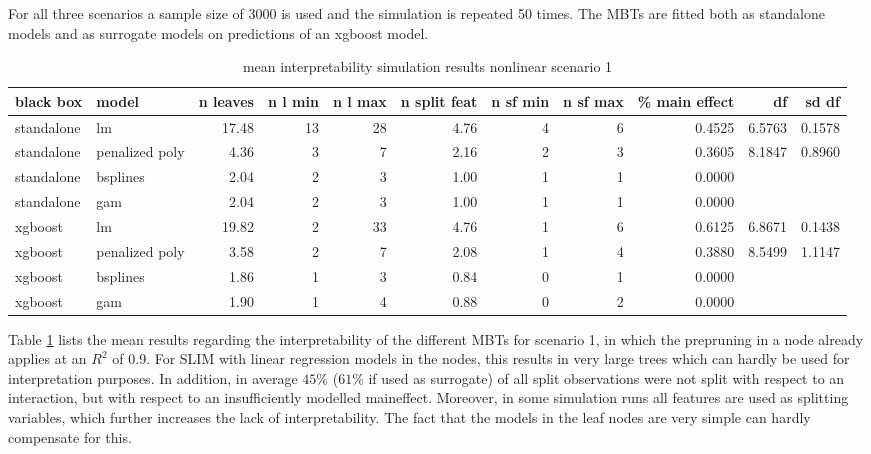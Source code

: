 For all three scenarios a sample size of 3000 is used and the simulation is repeated 50 times. The MBTs are fitted both as standalone models and as surrogate models on predictions of an xgboost model.


\begin{table}[!htb]

\caption{mean interpretability simulation results nonlinear scenario 1}
\centering \tiny
\begin{tabular}[t]{l|l|r|r|r|r|r|r|r|r|r}
\hline
black box & model & n leaves & n l min & n l max & n split feat & n sf min & n sf max & \% main effect & df & sd df\\
\hline
standalone & lm & 17.48 & 13 & 28 & 4.76 & 4 & 6 & 0.4525 & 6.5763 & 0.1578\\
standalone & penalized poly & 4.36 & 3 & 7 & 2.16 & 2 & 3 & 0.3605 & 8.1847 & 0.8960\\
standalone & bsplines & 2.04 & 2 & 3 & 1.00 & 1 & 1 & 0.0000 &  & \\
standalone & gam & 2.04 & 2 & 3 & 1.00 & 1 & 1 & 0.0000 &  & \\
\hline
xgboost & lm & 19.82 & 2 & 33 & 4.76 & 1 & 6 & 0.6125 & 6.8671 & 0.1438\\
xgboost & penalized poly & 3.58 & 2 & 7 & 2.08 & 1 & 4 & 0.3880 & 8.5499 & 1.1147\\
xgboost & bsplines & 1.86 & 1 & 3 & 0.84 & 0 & 1 & 0.0000 &  & \\
xgboost & gam & 1.90 & 1 & 4 & 0.88 & 0 & 2 & 0.0000 &  & \\

\hline
\end{tabular}
\label{tab:linear_mixed_1_interpretability}

\end{table}

Table \ref{tab:linear_mixed_1_interpretability} lists the mean results regarding the interpretability of the different MBTs for scenario 1, in which the prepruning in a node already applies at an $R^2$ of 0.9. For SLIM with linear regression models in the nodes, this results in very large trees which can hardly be used for interpretation purposes.
In addition, in average $45\%$ ($61\%$ if used as surrogate) of all split observations were not split with respect to an interaction, but with respect to an insufficiently modelled maineffect. Moreover, in some simulation runs all features are used as splitting variables, which further increases the lack of interpretability.
The fact that the models in the leaf nodes are very simple can hardly compensate for this. 


